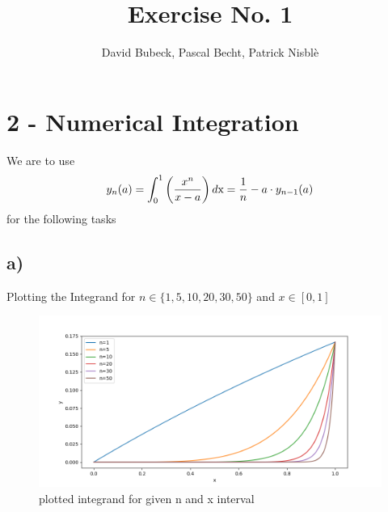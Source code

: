 \documentclass[11pt, a4paper, reqno]{scrartcl}
\begin{document}
    \title{Exercise No. 1}
    \author{David Bubeck, Pascal Becht, Patrick Nisbl\`e}
    \maketitle
    

    \newpage
    \section*{2 - Numerical Integration}
    
    We are to use 
    \begin{align}
        y_n(a)
            =\int_{0}^{1}\left(\frac{x^n}{x-a}\right)d\text x
            =\frac 1 n -a\cdot y_{n-1}(a)
    \end{align}
    for the following tasks
    \subsection*{a)}
    Plotting the Integrand for $n \in \{1,5,10,20,30,50\}$ and $x\in [0,1]$
    \begin{figure}[H]
                
    \end{figure}
    
    \begin{figure}[H]
        \includegraphics[width=.7\paperwidth]{01-2a}
        \caption{plotted integrand for given n and x interval}
    \end{figure}
\end{document}
